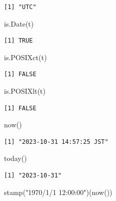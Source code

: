 \documentclass[
  letterpaper,
  DIV=11,
  numbers=noendperiod]{scrreprt}
\newenvironment{Shaded}{\begin{snugshade}}{\end{snugshade}}
\newcommand{\FunctionTok}[1]{\textcolor[rgb]{0.28,0.35,0.67}{#1}}
\newcommand{\NormalTok}[1]{\textcolor[rgb]{0.00,0.23,0.31}{#1}}
\newcommand{\StringTok}[1]{\textcolor[rgb]{0.13,0.47,0.30}{#1}}
\begin{document}
\begin{verbatim}
[1] "UTC"
\end{verbatim}

\begin{Shaded}
\begin{Highlighting}[]
\FunctionTok{is.Date}\NormalTok{(t)}
\end{Highlighting}
\end{Shaded}

\begin{verbatim}
[1] TRUE
\end{verbatim}

\begin{Shaded}
\begin{Highlighting}[]
\FunctionTok{is.POSIXct}\NormalTok{(t)}
\end{Highlighting}
\end{Shaded}

\begin{verbatim}
[1] FALSE
\end{verbatim}

\begin{Shaded}
\begin{Highlighting}[]
\FunctionTok{is.POSIXlt}\NormalTok{(t)}
\end{Highlighting}
\end{Shaded}

\begin{verbatim}
[1] FALSE
\end{verbatim}

\begin{Shaded}
\begin{Highlighting}[]
\FunctionTok{now}\NormalTok{()}
\end{Highlighting}
\end{Shaded}

\begin{verbatim}
[1] "2023-10-31 14:57:25 JST"
\end{verbatim}

\begin{Shaded}
\begin{Highlighting}[]
\FunctionTok{today}\NormalTok{()}
\end{Highlighting}
\end{Shaded}

\begin{verbatim}
[1] "2023-10-31"
\end{verbatim}

\begin{Shaded}
\begin{Highlighting}[]
\FunctionTok{stamp}\NormalTok{(}\StringTok{"1970/1/1 12:00:00"}\NormalTok{)(}\FunctionTok{now}\NormalTok{())}
\end{Highlighting}
\end{Shaded}
\end{document}
